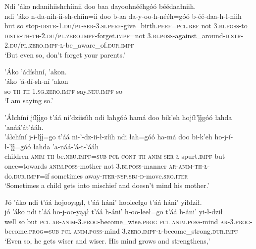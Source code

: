 \ea\label{ex:text6-16-21}
Ndi ’áko ndanihiishchíinii doo baa dayoohnééhgóó béédaałniih.\\
\gll ndi	’áko	n-da-nih-ii-sh-chíin=ii	doo	b-aa	da-y-oo-h-nééh=góó	b-éé-daa-h-l-niih\\
     but	so	stop-\textsc{distr}-1.\textsc{du}/\textsc{pl}-\textsc{ser}-3.\textsc{si}.\textsc{perf}-give\_birth.\textsc{perf}=\textsc{pcl}.\textsc{ref}	not	3.\textsc{bi}.\textsc{poss}-to	\textsc{distr}-\textsc{th}-\textsc{th}-2.\textsc{du}/\textsc{pl}.\textsc{zero}.\textsc{impf}-forget.\textsc{impf}=not	3.\textsc{bi}.\textsc{poss}-against\_around-\textsc{distr}-2.\textsc{du}/\textsc{pl}.\textsc{zero}.\textsc{impf}-\textsc{l}-be\_aware\_of.\textsc{dur}.\textsc{impf}\\
\glt `But even so, don't forget your parents.'
\z

\ea\label{ex:text6-16-22}
’Áko ’ádíshní, ’akon.\\
\gll ’áko	’á-dí-sh-ní	’akon\\
     so	\textsc{th}-\textsc{th}-1.\textsc{sg}.\textsc{zero}.\textsc{impf}-say.\textsc{neu}.\textsc{impf}	so\\
\glt `I am saying so.'
\z

\ea\label{ex:text6-16-23}
’Áłchíní jílį́įgo t’áá ni’dziisíih ndi łahgóó hamá doo bik’eh hojíł’į́į́góó łahda ’anáá’át’ááh.\\
\gll ’áłchíní	j-í-lį́į=go	t’áá	ni-’-dz-ii-ł-zíih	ndi	łah=góó	ha-má	doo	bi-k’eh	ho-j-í-ł-’į́į́=góó	łahda	’a-náá-’á-t-’ááh\\
     children	\textsc{anim}-\textsc{th}-be.\textsc{neu}.\textsc{impf}=\textsc{sub}	\textsc{pcl}	\textsc{cont}-\textsc{th}-\textsc{anim}-\textsc{ser}-\textsc{ł}-spurt.\textsc{impf}	but	once=towards	\textsc{anim}.\textsc{poss}-mother	not	3.\textsc{bi}.\textsc{poss}-manner	\textsc{ar}-\textsc{anim}-\textsc{th}-\textsc{ł}-do.\textsc{dur}.\textsc{impf}=if	sometimes	away-\textsc{iter}-\textsc{nsp}.\textsc{sbj}-\textsc{d}-move.\textsc{sro}.\textsc{iter}\\
\glt `Sometimes a child gets into mischief and doesn't mind his mother.'
\z

\ea\label{ex:text6-16-24}
Jó ’áko ndi t’áá hojooyąął, t’áá háni’ hooleełgo t’áá háni’ yiłdził.\\
\gll jó	’áko	ndi	t’áá	ho-j-oo-yąął	t’áá	h-áni’	h-oo-leeł=go	t’áá	h-áni’	yi-ł-dził\\
     well	so	but	\textsc{pcl}	\textsc{ar}-\textsc{anim}-3.\textsc{prog}-become\_wise.\textsc{prog}	\textsc{pcl}	\textsc{anim}.\textsc{poss}-mind	\textsc{ar}-3.\textsc{prog}-become.\textsc{prog}=\textsc{sub}	\textsc{pcl}	\textsc{anim}.\textsc{poss}-mind	3.\textsc{zero}.\textsc{impf}-\textsc{ł}-become\_strong.\textsc{dur}.\textsc{impf}\\
\glt `Even so, he gets wiser and wiser. His mind grows and strengthens,'
\z

